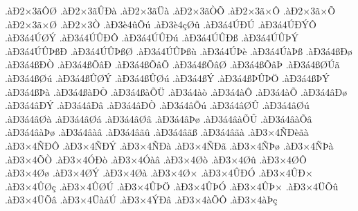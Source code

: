 {.^^e0^^d02^^d73^^e3^^d4^^d8
.^^e0^^d02^^d73^^e3^^db^^d0^^e0
.^^e0^^d02^^d73^^e3^^dc^^e0
.^^e0^^d02^^d73^^e3^^d2^^d5
.^^e0^^d02^^d73^^e3^^d7^^d4
.^^e0^^d02^^d73^^e3^^d7^^d5
.^^e0^^d02^^d73^^e3^^d7^^d8
.^^e0^^d02^^d73^^d2
.^^e0^^d03^^e84^^fb^^d5^^fa
.^^e0^^d03^^e84^^e7^^d8^^fb
.^^e0^^d03^^e14^^da^^d0^^da
.^^e0^^d03^^e14^^da^^d0^^dd^^d4
.^^e0^^d03^^e14^^da^^d8^^dd
.^^e0^^d03^^e14^^da^^db^^d0^^d4
.^^e0^^d03^^e14^^da^^db^^d0^^fa
.^^e0^^d03^^e14^^da^^db^^d0^^df
.^^e0^^d03^^e14^^da^^db^^de^^dd
.^^e0^^d03^^e14^^da^^db^^de^^df^^d0
.^^e0^^d03^^e14^^da^^db^^de^^df^^d8
.^^e0^^d03^^e14^^da^^db^^de^^df^^f9
.^^e0^^d03^^e14^^da^^de^^e8
.^^e0^^d03^^e14^^da^^e0^^de^^df
.^^e0^^d03^^e14^^df^^d0^^f8
.^^e0^^d03^^e14^^df^^d0^^d2
.^^e0^^d03^^e14^^df^^d5^^e2^^d0
.^^e0^^d03^^e14^^df^^d5^^e2^^d5
.^^e0^^d03^^e14^^df^^d5^^e2^^d8
.^^e0^^d03^^e14^^df^^d5^^e2^^de
.^^e0^^d03^^e14^^df^^d8^^da^^e3
.^^e0^^d03^^e14^^df^^d8^^fa
.^^e0^^d03^^e14^^df^^db^^d8^^dd
.^^e0^^d03^^e14^^df^^db^^d8^^fa
.^^e0^^d03^^e14^^df^^dd
.^^e0^^d03^^e14^^df^^de^^db^^de^^d6
.^^e0^^d03^^e14^^df^^de^^dd
.^^e0^^d03^^e14^^df^^de^^e0
.^^e0^^d03^^e14^^df^^e0^^d0^^d2
.^^e0^^d03^^e14^^df^^e0^^d5^^dc
.^^e0^^d03^^e14^^e0^^f2
.^^e0^^d03^^e14^^e0^^d4
.^^e0^^d03^^e14^^e0^^d5
.^^e0^^d03^^e14^^e2^^d0^^f8
.^^e0^^d03^^e14^^e2^^d0^^dd
.^^e0^^d03^^e14^^e2^^d0^^e2
.^^e0^^d03^^e14^^e2^^d0^^d2
.^^e0^^d03^^e14^^e2^^d5^^fa
.^^e0^^d03^^e14^^e2^^d8^^db
.^^e0^^d03^^e14^^e2^^d8^^fa
.^^e0^^d03^^e14^^e2^^d8^^e0
.^^e0^^d03^^e14^^e2^^d8^^e1
.^^e0^^d03^^e14^^e2^^d8^^e2
.^^e0^^d03^^e14^^e2^^de^^f8
.^^e0^^d03^^e14^^e2^^e0^^d5^^db
.^^e0^^d03^^e14^^e2^^e0^^d5^^e2
.^^e0^^d03^^e14^^e2^^e0^^de^^f8
.^^e0^^d03^^e14^^e2^^e0^^e2
.^^e0^^d03^^e14^^e2^^e3^^fb
.^^e0^^d03^^e14^^e2^^e3^^df
.^^e0^^d03^^e14^^e2^^e3^^e0
.^^e0^^d03^^d74^^d1^^d0^^e8^^e3^^e0
.^^e0^^d03^^d74^^d1^^d0^^d4
.^^e0^^d03^^d74^^d1^^d0^^dd
.^^e0^^d03^^d74^^d1^^d0^^e0
.^^e0^^d03^^d74^^d1^^d0^^e3
.^^e0^^d03^^d74^^d1^^de^^f8
.^^e0^^d03^^d74^^d1^^de^^e0
.^^e0^^d03^^d74^^d5^^d2
.^^e0^^d03^^d74^^d3^^d0^^f2
.^^e0^^d03^^d74^^d3^^e0^^e2
.^^e0^^d03^^d74^^d8^^f2
.^^e0^^d03^^d74^^d8^^fb
.^^e0^^d03^^d74^^d8^^d4
.^^e0^^d03^^d74^^d8^^f8
.^^e0^^d03^^d74^^d8^^dd
.^^e0^^d03^^d74^^d8^^e0
.^^e0^^d03^^d74^^d8^^d7
.^^e0^^d03^^d74^^db^^d0^^d3
.^^e0^^d03^^d74^^db^^d0^^d7
.^^e0^^d03^^d74^^db^^d8^^e7
.^^e0^^d03^^d74^^db^^d8^^da
.^^e0^^d03^^d74^^db^^de^^d6
.^^e0^^d03^^d74^^db^^de^^d3
.^^e0^^d03^^d74^^db^^de^^d7
.^^e0^^d03^^d74^^dc^^d5^^fb
.^^e0^^d03^^d74^^dc^^d5^^e2
.^^e0^^d03^^d74^^dc^^e0^^e1^^da
.^^e0^^d03^^d74^^dd^^d0^^e2
.^^e0^^d03^^d74^^e0^^d5^^d4
.^^e0^^d03^^d74^^e0^^de^^e7
}

